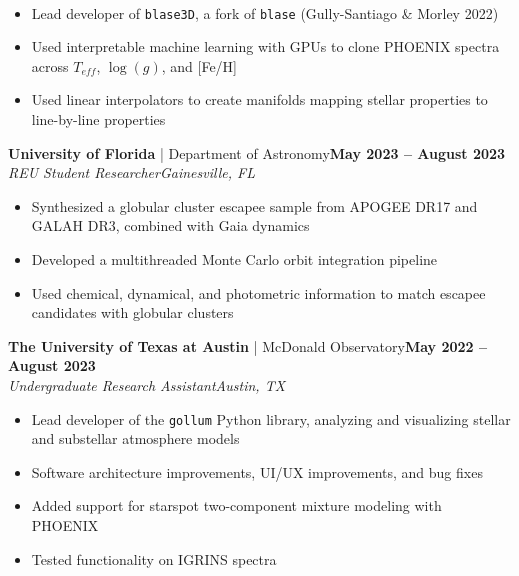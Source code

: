 \documentclass[11pt]{article}
\begin{document}
\\ \begin{itemize}[itemsep=-3pt, parsep=3pt, label={--}]
    \item Lead developer of \texttt{blase3D}, a fork of \texttt{blase} (Gully-Santiago \& Morley 2022)
    \item Used interpretable machine learning with GPUs to clone PHOENIX spectra across $T_{eff}$, $\log{(g)}$, and [Fe/H]
    \item Used linear interpolators to create manifolds mapping stellar properties to line-by-line properties
\end{itemize}
\normalsize\textbf{University of Florida} | Department of Astronomy\hfill\small\textbf{May 2023 -- August 2023}
\\ \textit{REU Student Researcher\hfill Gainesville, FL} \vspace{-15pt}
\\ \begin{itemize}[itemsep=-3pt, parsep=3pt, label={--}]
    \item Synthesized a globular cluster escapee sample from APOGEE DR17 and GALAH DR3, combined with Gaia dynamics
    \item Developed a multithreaded Monte Carlo orbit integration pipeline
    \item Used chemical, dynamical, and photometric information to match escapee candidates with globular clusters
\end{itemize}
\normalsize\textbf{The University of Texas at Austin} | McDonald Observatory\hfill\small\textbf{May 2022 -- August 2023}
\\ \textit{Undergraduate Research Assistant\hfill Austin, TX} \vspace{-15pt}
\\ \begin{itemize}[itemsep=-3pt, parsep=3pt, label={--}]
    \item Lead developer of the \texttt{gollum} Python library, analyzing and visualizing stellar and substellar atmosphere models
    \item Software architecture improvements, UI/UX improvements, and bug fixes
    \item Added support for starspot two-component mixture modeling with PHOENIX
    \item Tested functionality on IGRINS spectra
\end{itemize}
\end{document}
